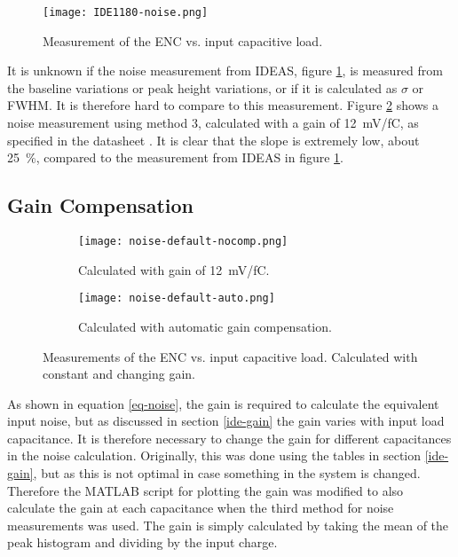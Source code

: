 \documentclass[../main/thesis.tex]{subfiles}
\begin{document}
\begin{figure}%
	\centering
	\texttt{[image: IDE1180-noise.png]}
	\caption{Measurement of the \gls{ENC} vs. input capacitive load. \citep{IDE1180}}
	\label{fig-ide-noise}
\end{figure} 

It is unknown if the noise measurement from IDEAS, figure \ref{fig-ide-noise}, is measured from the baseline variations or peak height variations, or if it is calculated as $\sigma$ or \gls{FWHM}. It is therefore hard to compare to this measurement. Figure \ref{fig-noise-nocomp} shows a noise measurement using method 3, calculated with a gain of 12~mV/fC, as specified in the datasheet \citep{IDE1180}. It is clear that the slope is extremely low, about 25~\%, compared to the measurement from IDEAS in figure \ref{fig-ide-noise}. 

\newpage
\subsection{Gain Compensation}
\label{ide-noise-gain}

\begin{figure} 
	\centering
	\begin{subfigure}{.5\textwidth}
		\centering
		\texttt{[image: noise-default-nocomp.png]}
		\caption{Calculated with gain of 12~mV/fC.}
		\label{fig-noise-nocomp}
	\end{subfigure}%
	\begin{subfigure}{.5\textwidth}%
		\centering
		\texttt{[image: noise-default-auto.png]}
		\caption{Calculated with automatic gain compensation.}
		\label{fig-noise-auto} 
	\end{subfigure}
	\caption{Measurements of the \gls{ENC} vs. input capacitive load. Calculated with constant and changing gain.}
	\label{fig-noise-nocomp-auto}
\end{figure}

As shown in equation \ref{eq-noise}, the gain is required to calculate the equivalent input noise, but as discussed in section \ref{ide-gain} the gain varies with input load capacitance. It is therefore necessary to change the gain for different capacitances in the noise calculation. Originally, this was done using the tables in section \ref{ide-gain}, but as this is not optimal in case something in the system is changed. Therefore the MATLAB script for plotting the gain was modified to also calculate the gain at each capacitance when the third method for noise measurements was used. The gain is simply calculated by taking the mean of the peak histogram and dividing by the input charge. 
\end{document}
